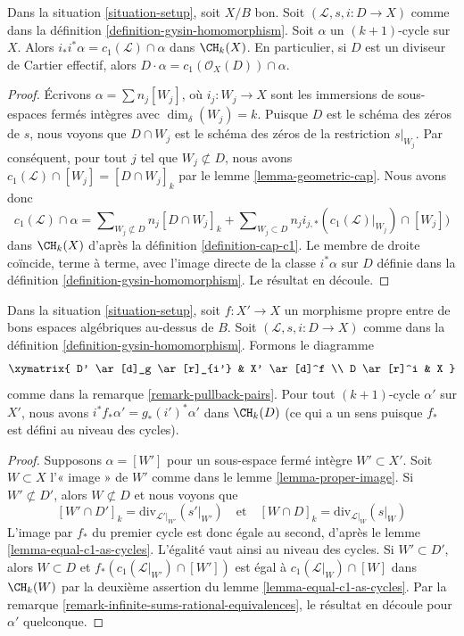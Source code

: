 \begin{lemma}
\label{lemma-support-cap-effective-Cartier}
Dans la situation \ref{situation-setup}, soit $X/B$ bon. Soit
$(\mathcal{L}, s, i : D \to X)$ comme dans la définition
\ref{definition-gysin-homomorphism}. Soit $\alpha$ un $(k + 1)$-cycle sur $X$.
Alors $i_*i^*\alpha = c_1(\mathcal{L}) \cap \alpha$ dans $\CH_k(X)$. En
particulier, si $D$ est un diviseur de Cartier effectif, alors $D \cdot \alpha =
c_1(\mathcal{O}_X(D)) \cap \alpha$.
\end{lemma}

\begin{proof}
Écrivons $\alpha = \sum n_j[W_j]$, où $i_j : W_j \to X$ sont les immersions de sous-espaces
fermés intègres avec $\dim_\delta(W_j) = k$. Puisque $D$ est le schéma des zéros
de $s$, nous voyons que $D \cap W_j$ est le schéma des zéros de
la restriction $s|_{W_j}$. Par conséquent, pour tout $j$ tel que $W_j \not
\subset D$, nous avons $c_1(\mathcal{L}) \cap [W_j] = [D \cap W_j]_k$ par le
lemme \ref{lemma-geometric-cap}. Nous avons donc
$$
c_1(\mathcal{L}) \cap \alpha
=
\sum\nolimits_{W_j \not \subset D} n_j[D \cap W_j]_k
+
\sum\nolimits_{W_j \subset D}
n_j i_{j, *}(c_1(\mathcal{L})|_{W_j}) \cap [W_j])
$$
dans $\CH_k(X)$ d'après la définition \ref{definition-cap-c1}. Le membre de droite
coïncide, terme à terme, avec l'image directe de la classe $i^*\alpha$ sur $D$
définie dans la définition \ref{definition-gysin-homomorphism}. Le résultat en découle.
\end{proof}

\begin{lemma}
\label{lemma-closed-in-X-gysin}
Dans la situation \ref{situation-setup}, soit $f : X' \to X$ un morphisme
propre entre de bons espaces algébriques au-dessus de $B$. Soit $(\mathcal{L}, s, i : D \to
X)$ comme dans la définition \ref{definition-gysin-homomorphism}. Formons le
diagramme
$$
\xymatrix{
D' \ar[d]_g \ar[r]_{i'} & X' \ar[d]^f \\
D \ar[r]^i & X
}
$$
comme dans la remarque \ref{remark-pullback-pairs}. Pour tout $(k + 1)$-cycle
$\alpha'$ sur $X'$, nous avons $i^*f_*\alpha' = g_*(i')^*\alpha'$ dans
$\CH_k(D)$ (ce qui a un sens puisque $f_*$ est défini au niveau des cycles).
\end{lemma}

\begin{proof}
Supposons $\alpha = [W']$ pour un sous-espace fermé intègre $W' \subset X'$.
Soit $W \subset X$ l'« image » de $W'$ comme dans le lemme
\ref{lemma-proper-image}. Si $W' \not \subset D'$, alors $W \not
\subset D$ et nous voyons que
$$
[W' \cap D']_k = \text{div}_{\mathcal{L}'|_{W'}}({s'|_{W'}})
\quad\text{et}\quad
[W \cap D]_k = \text{div}_{\mathcal{L}|_W}(s|_W)
$$
L'image par $f_*$ du premier cycle est donc égale au second, d'après le lemme
\ref{lemma-equal-c1-as-cycles}.
L'égalité vaut ainsi au niveau des cycles.
Si $W' \subset D'$, alors $W \subset D$ et
$f_*(c_1(\mathcal{L}|_{W'}) \cap [W'])$ est égal à $c_1(\mathcal{L}|_W) \cap
[W]$ dans $\CH_k(W)$ par la deuxième assertion du lemme
\ref{lemma-equal-c1-as-cycles}. Par la remarque
\ref{remark-infinite-sums-rational-equivalences}, le résultat en découle pour
$\alpha'$ quelconque.
\end{proof}

